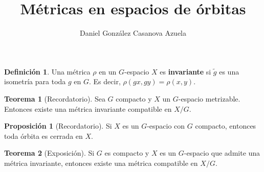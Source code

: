 \documentclass[spanish]{article}
\title{Métricas en espacios de órbitas}
\author{Daniel González Casanova Azuela}
\theoremstyle{definition}
\newtheorem*{defn}{Definición}
\newtheorem*{teo}{Teorema}
\newtheorem*{prop}{Proposición}
\begin{document}
\maketitle
	\begin{defn}
		Una métrica $\rho$ en un $G$-espacio $X$ es \textbf{invariante} si $\tilde{g}$ es una isometría para toda $g$ en $G$. Es decir, $\rho(gx,gy)=\rho(x,y)$.
	\end{defn}
	\begin{teo}[Recordatorio]
		Sea $G$ compacto y $X$ un $G$-espacio metrizable. Entonces existe una métrica invariante compatible en $X/G$.
	\end{teo}
	\begin{prop}[Recordatorio]
		Si $X$ es un $G$-espacio con $G$ compacto, entonces toda órbita es cerrada en $X$.
	\end{prop}
	\begin{teo}[Exposición]
		Si $G$ es compacto y $X$ es un $G$-espacio que admite una métrica invariante, entonces existe una métrica compatible en $X/G$.
	\end{teo}
\end{document}
